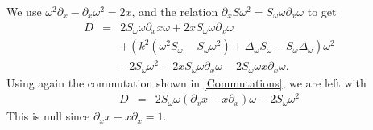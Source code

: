 \documentclass[a4paper]{article}
\begin{document}
We use $\omega^2 \partial_x - \partial_x \omega^2 = 2x$, and the relation $\partial_x S \omega^2 = S_\omega \omega \partial_x \omega$ to get
\begin{eqnarray*}
	D &=& 2 S_\omega \omega \partial_x x\omega + 2 x S_\omega  \omega \partial_x \omega \\
	&& + \left(k^2(\omega^2 S_\omega - S_\omega \omega^2) + \Delta_\omega S_\omega - S_\omega \Delta_\omega \right)\omega^2\\
	&& - 2 S_\omega \omega^2 - 2 x  S_\omega \omega \partial_x \omega - 2 S_\omega \omega x \partial_x \omega.
\end{eqnarray*}
Using again the commutation shown in \autoref{Commutations}, we are left with 
\begin{eqnarray*}
	D &=&  2 S_\omega \omega (\partial_x x - x \partial_x) \omega - 2 S_\omega \omega^2
\end{eqnarray*}
This is null since $\partial_x x - x \partial_x = 1$. 
\end{document}
